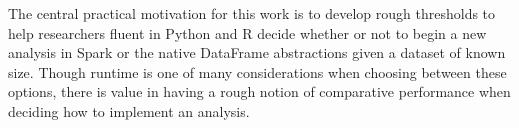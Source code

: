 \documentclass[11pt]{article}
\begin{document}
The central practical motivation for this work is to develop rough thresholds to help researchers fluent in Python and R decide whether or not to begin a new analysis in Spark or the native DataFrame abstractions given a dataset of known size. Though runtime is one of many considerations when choosing between these options, there is value in having a rough notion of comparative performance when deciding how to implement an analysis. 




\end{document}
